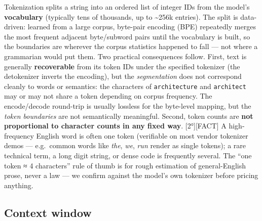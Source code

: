 Tokenization splits a string into an ordered list of integer IDs from
the model's \textbf{vocabulary} (typically tens of thousands, up to
\textasciitilde256k entries). The split is data-driven: learned from a
large corpus, byte-pair encoding (BPE) repeatedly merges the most
frequent adjacent byte/subword pairs until the vocabulary is built, so
the boundaries are wherever the corpus statistics happened to fall ---
not where a grammarian would put them. Two practical consequences
follow. First, text is generally \textbf{recoverable} from its token IDs
under the specified tokenizer (the detokenizer inverts the encoding),
but the \emph{segmentation} does not correspond cleanly to words or
semantics: the characters of \texttt{architecture} and
\texttt{architect} may or may not share a token depending on corpus
frequency. The encode/decode round-trip is usually lossless for the
byte-level mapping, but the \emph{token boundaries} are not semantically
meaningful. Second, token counts are \textbf{not proportional to
character counts in any fixed way}. \mbox{{[}2°{]}}\hspace{0pt}\mbox{{[}FACT{]}} A high-frequency
English word is often one token (verifiable on most vendor tokenizer
demos --- e.g.~common words like \emph{the}, \emph{we}, \emph{run}
render as single tokens); a rare technical term, a long digit string, or
dense code is frequently several. The ``one token ≈ 4 characters'' rule
of thumb is for rough estimation of general-English prose, never a law
--- we confirm against the model's own tokenizer before pricing
anything.

\subsection{Context window}\label{context-window}

